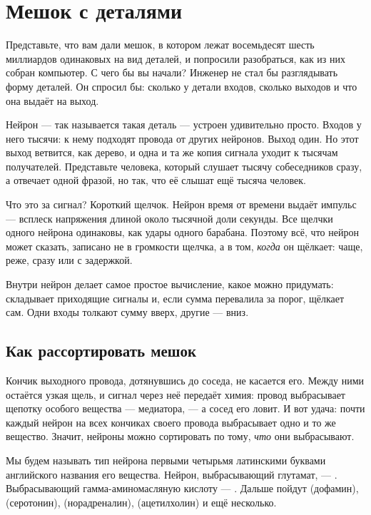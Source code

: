 \chapter{Мешок с деталями}


Представьте, что вам дали мешок, в котором лежат восемьдесят шесть миллиардов одинаковых на вид деталей, и попросили разобраться, как из них собран компьютер. С чего бы вы начали? Инженер не стал бы разглядывать форму деталей. Он спросил бы: сколько у детали входов, сколько выходов и что она выдаёт на выход.

Нейрон --- так называется такая деталь --- устроен удивительно просто. Входов у него тысячи: к нему подходят провода от других нейронов. Выход один. Но этот выход ветвится, как дерево, и одна и та же копия сигнала уходит к тысячам получателей. Представьте человека, который слушает тысячу собеседников сразу, а отвечает одной фразой, но так, что её слышат ещё тысяча человек.

Что это за сигнал? Короткий щелчок. Нейрон время от времени выдаёт импульс --- всплеск напряжения длиной около тысячной доли секунды. Все щелчки одного нейрона одинаковы, как удары одного барабана. Поэтому всё, что нейрон может сказать, записано не в громкости щелчка, а в том, \emph{когда} он щёлкает: чаще, реже, сразу или с задержкой.

Внутри нейрон делает самое простое вычисление, какое можно придумать: складывает приходящие сигналы и, если сумма перевалила за порог, щёлкает сам. Одни входы толкают сумму вверх, другие --- вниз.

\section*{Как рассортировать мешок}

Кончик выходного провода, дотянувшись до соседа, не касается его. Между ними остаётся узкая щель, и сигнал через неё передаёт химия: провод выбрасывает щепотку особого вещества --- медиатора, --- а сосед его ловит. И вот удача: почти каждый нейрон на всех кончиках своего провода выбрасывает одно и то же вещество. Значит, нейроны можно сортировать по тому, \emph{что} они выбрасывают.

Мы будем называть тип нейрона первыми четырьмя латинскими буквами английского названия его вещества. Нейрон, выбрасывающий глутамат, --- . Выбрасывающий гамма-аминомасляную кислоту --- . Дальше пойдут  (дофамин),  (серотонин),  (норадреналин),  (ацетилхолин) и ещё несколько.


